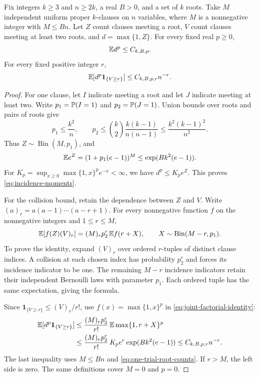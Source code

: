 \begin{lemma}\label{lem:weighted-root-counts}
Fix integers \(k\ge3\) and \(n\ge2k\), a real \(B>0\), and a set
of \(k\) roots.  Take \(M\) independent uniform proper \(k\)-clauses
on \(n\) variables, where \(M\) is a nonnegative integer with
\(M\le Bn\).  Let \(Z\) count clauses
meeting a root, \(V\) count clauses meeting at least two roots, and
\(d=\max\{1,Z\}\).  For every fixed real \(p\ge0\),
\begin{equation}\label{eq:incidence-moments}
 \mathbb E d^p\le C_{k,B,p}.
\end{equation}
For every fixed positive integer \(r\),
\begin{equation}\label{eq:weighted-collision-moments}
 \mathbb E[d^p\mathbf1_{\{V\ge r\}}]\le C_{k,B,p,r}n^{-r}.
\end{equation}
\end{lemma}

\begin{proof}
For one clause, let \(I\) indicate meeting a root and let \(J\)
indicate meeting at least two.  Write \(p_1=\mathbb P(I=1)\) and
\(p_2=\mathbb P(J=1)\).  Union bounds over roots and pairs of roots give
\begin{equation}\label{eq:one-trial-root-counts}
 p_1\le\frac{k^2}{n},\qquad
 p_2\le\binom{k}{2}\frac{k(k-1)}{n(n-1)}
      \le\frac{k^2(k-1)^2}{n^2}.
\end{equation}
Thus \(Z\sim\operatorname{Bin}(M,p_1)\), and
\[
 \mathbb E e^Z=(1+p_1(e-1))^M
 \le\exp(Bk^2(e-1)).
\]
For \(K_p=\sup_{x\ge0}\max\{1,x\}^pe^{-x}<\infty\), we have
\(d^p\le K_pe^Z\).  This proves \eqref{eq:incidence-moments}.

For the collision bound, retain the dependence between \(Z\) and \(V\).
Write \((a)_r=a(a-1)\cdots(a-r+1)\).  For every nonnegative function
\(f\) on the nonnegative integers and \(1\le r\le M\),
\begin{equation}\label{eq:joint-factorial-identity}
 \mathbb E[f(Z)(V)_r]
 =(M)_r p_2^r\,\mathbb E f(r+X),
 \qquad X\sim\operatorname{Bin}(M-r,p_1).
\end{equation}
To prove the identity, expand \((V)_r\) over ordered \(r\)-tuples
of distinct clause indices.  A collision at each chosen index has
probability \(p_2^r\) and forces its incidence indicator to be one.
The remaining \(M-r\) incidence indicators retain their independent
Bernoulli laws with parameter \(p_1\).  Each ordered tuple has the
same expectation, giving the formula.

Since \(\mathbf1_{\{V\ge r\}}\le(V)_r/r!\), use
\(f(x)=\max\{1,x\}^p\) in \eqref{eq:joint-factorial-identity}:
\begin{align*}
 \mathbb E[d^p\mathbf1_{\{V\ge r\}}]
 &\le\frac{(M)_r p_2^r}{r!}\,
          \mathbb E\max\{1,r+X\}^p\\
 &\le\frac{(M)_r p_2^r}{r!}\,
          K_pe^r\exp(Bk^2(e-1))
 \le C_{k,B,p,r}n^{-r}.
\end{align*}
The last inequality uses \(M\le Bn\) and
\eqref{eq:one-trial-root-counts}.  If \(r>M\), the left side is zero.
The same definitions cover \(M=0\) and \(p=0\).
\end{proof}

